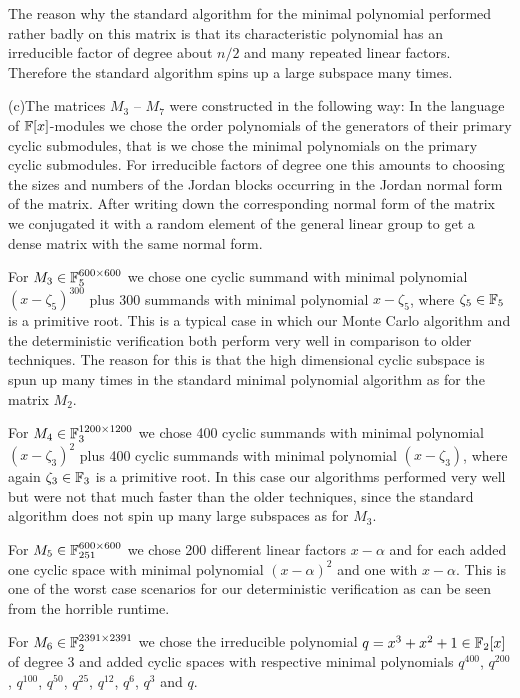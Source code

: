 The reason why the standard algorithm for the minimal polynomial
performed rather badly on this matrix is that its characteristic polynomial
has an irreducible factor of degree about $n/2$ and many repeated linear
factors. Therefore the standard algorithm spins up a large subspace
many times.

(c)\quad The matrices $M_3$ -- $M_7$ were constructed in the following way:
In the language of $\mathbb{F}[x]$-modules we chose the order polynomials of
the generators of their primary cyclic submodules, that is we chose the
minimal polynomials on the primary cyclic submodules. For irreducible factors
of degree one this amounts to choosing the sizes and numbers of the
Jordan blocks occurring in the Jordan normal form of the matrix.
After writing down the corresponding normal form of the matrix we
conjugated it with a random element of the general linear group to
get a dense matrix with the same normal form.

For $M_3 \in \mathbb{F}_5^{600 \times 600}$ we chose one cyclic summand with
minimal polynomial $(x-\zeta_5)^{300}$ plus 300 summands with minimal
polynomial $x-\zeta_5$, where $\zeta_5 \in \mathbb{F}_5$ is a primitive root.
This is a typical case in which our Monte Carlo algorithm and
the deterministic verification both perform very well in comparison
to older techniques. The reason for this is that the high dimensional
cyclic subspace is spun up many times in the standard minimal polynomial
algorithm as for the matrix $M_2$.

For $M_4 \in \mathbb{F}_3^{1200 \times 1200}$ we chose 400 cyclic summands with
minimal polynomial $(x-\zeta_3)^2$ plus 400 cyclic summands with
minimal polynomial $(x-\zeta_3)$, where again $\zeta_3 \in \mathbb{F}_3$ is
a primitive root. In this case our algorithms performed very well but were not
that much faster than the older techniques, since the standard algorithm
does not spin up many large subspaces as for $M_3$.

For $M_5 \in \mathbb{F}_{251}^{600 \times 600}$ we chose 200 different linear
factors $x-\alpha$ and for each added one cyclic space with minimal polynomial
$(x-\alpha)^2$ and one with $x-\alpha$. This is one of the worst case
scenarios for our deterministic verification as can be seen from the
horrible runtime.

For $M_6 \in \mathbb{F}_2^{2391 \times 2391}$ we chose the irreducible polynomial
$q = x^3+x^2+1 \in \mathbb{F}_2[x]$ of degree $3$ and added cyclic spaces with 
respective minimal polynomials $q^{400}$, $q^{200}$, $q^{100}$,
$q^{50}$, $q^{25}$, $q^{12}$, $q^6$, $q^3$ and $q$.

